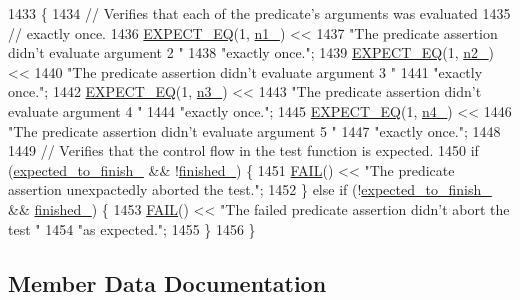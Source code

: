 \begin{DoxyCode}
1433                           \{
1434     \textcolor{comment}{// Verifies that each of the predicate's arguments was evaluated}
1435     \textcolor{comment}{// exactly once.}
1436     \hyperlink{gtest_8h_a4159019abda84f5366acdb7604ff220a}{EXPECT\_EQ}(1, \hyperlink{classPredicate4Test_a8eb30cd283e613f7a2e501a3969be9ae}{n1\_}) <<
1437         \textcolor{stringliteral}{"The predicate assertion didn't evaluate argument 2 "}
1438         \textcolor{stringliteral}{"exactly once."};
1439     \hyperlink{gtest_8h_a4159019abda84f5366acdb7604ff220a}{EXPECT\_EQ}(1, \hyperlink{classPredicate4Test_a088fce743c747e3851c926cb3a87fda3}{n2\_}) <<
1440         \textcolor{stringliteral}{"The predicate assertion didn't evaluate argument 3 "}
1441         \textcolor{stringliteral}{"exactly once."};
1442     \hyperlink{gtest_8h_a4159019abda84f5366acdb7604ff220a}{EXPECT\_EQ}(1, \hyperlink{classPredicate4Test_a00ae6ae54c7d6639d448c036aedb6114}{n3\_}) <<
1443         \textcolor{stringliteral}{"The predicate assertion didn't evaluate argument 4 "}
1444         \textcolor{stringliteral}{"exactly once."};
1445     \hyperlink{gtest_8h_a4159019abda84f5366acdb7604ff220a}{EXPECT\_EQ}(1, \hyperlink{classPredicate4Test_ae42e23ce11e3f1c6b813496d6180cc67}{n4\_}) <<
1446         \textcolor{stringliteral}{"The predicate assertion didn't evaluate argument 5 "}
1447         \textcolor{stringliteral}{"exactly once."};
1448 
1449     \textcolor{comment}{// Verifies that the control flow in the test function is expected.}
1450     \textcolor{keywordflow}{if} (\hyperlink{classPredicate4Test_a20600b5eda187c42ce4e812e77269654}{expected\_to\_finish\_} && !\hyperlink{classPredicate4Test_acfd174bf9dfb5a91afbcdca17e797888}{finished\_}) \{
1451       \hyperlink{gtest_8h_a3e26a8d27caa386ed0ea7ce9d5b7c4ed}{FAIL}() << \textcolor{stringliteral}{"The predicate assertion unexpactedly aborted the test."};
1452     \} \textcolor{keywordflow}{else} \textcolor{keywordflow}{if} (!\hyperlink{classPredicate4Test_a20600b5eda187c42ce4e812e77269654}{expected\_to\_finish\_} && \hyperlink{classPredicate4Test_acfd174bf9dfb5a91afbcdca17e797888}{finished\_}) \{
1453       \hyperlink{gtest_8h_a3e26a8d27caa386ed0ea7ce9d5b7c4ed}{FAIL}() << \textcolor{stringliteral}{"The failed predicate assertion didn't abort the test "}
1454                 \textcolor{stringliteral}{"as expected."};
1455     \}
1456   \}
\end{DoxyCode}


\subsection{Member Data Documentation}

